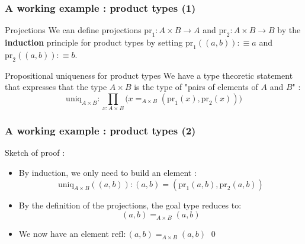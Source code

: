 \documentclass{beamer}
\begin{document}
        \begin{frame}
            \frametitle{A working example : product types (1)}
            \begin{exampleblock}{Projections}
                We can define projections $\mathrm{pr}_1 : A\times B \rightarrow A$ and $\mathrm{pr}_2 : A\times B \rightarrow B$ by the \textbf{induction} principle for product types by setting $\mathrm{pr}_1((a,b)) :\equiv a$ and $\mathrm{pr}_2((a,b)) :\equiv b$.
            \end{exampleblock}
            \pause
            \begin{exampleblock}{Propositional uniqueness for product types}
                We have a type theoretic statement that expresses that the type $A \times B$ is the type of "pairs of elements of $A$ and $B$" : 
                $$ \mathrm{uniq}_{A\times B} : \prod_{x : A \times B} \big(x =_{A \times B} (\mathrm{pr}_1(x),\mathrm{pr}_2(x))\big) $$
            \end{exampleblock}
        \end{frame}
        \begin{frame}
            \frametitle{A working example : product types (2)}
            Sketch of proof : 
            \begin{itemize}
                \item By induction, we only need to build an element : 
                $$\mathrm{uniq}_{A \times B} ((a,b)) : (a,b)=(\mathrm{pr}_1(a,b),\mathrm{pr}_2(a,b))$$
                \pause
                \item By the definition of the projections, the goal type reduces to: 
                $$(a,b)=_{A\times B} (a,b)$$
                \pause
                \item We now have an element $\mathrm{refl} : (a,b)=_{A\times B} (a,b)$ \qed
            \end{itemize}
            
        
        \end{frame}
\end{document}
